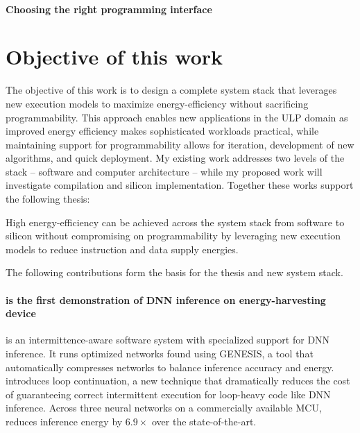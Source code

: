 \paragraph{Choosing the right programming interface}

\section{Objective of this work}

The objective of this work is to design a complete system stack that leverages new execution models to maximize energy-efficiency without sacrificing programmability.
% 
This approach enables new applications in the ULP domain as improved energy efficiency makes sophisticated workloads practical, while maintaining support for programmability allows for iteration, development of new algorithms, and quick deployment. 
% 
My existing work addresses two levels of the stack -- software and computer architecture -- while my proposed work will investigate compilation and silicon implementation.
% 
Together these works support the following thesis:

\begin{adjustwidth}{1cm}{1cm}
% 
% 
% 
High energy-efficiency can be achieved 
across the system stack from software to silicon without compromising on programmability by leveraging new execution models to reduce instruction and data supply energies.
% 

\end{adjustwidth}
% 
The following contributions form the basis for the thesis and new system stack.

\paragraph{\sonic is the first demonstration of DNN inference on energy-harvesting device}
\sonic is an intermittence-aware software system with specialized support for DNN inference. 
% 
It runs optimized networks found using GENESIS, a tool that automatically compresses networks to balance inference accuracy and energy.
% 
\sonic introduces loop continuation, a new technique that dramatically reduces the cost of guaranteeing correct intermittent execution for loop-heavy code like DNN inference. 
% 
Across three neural networks on a commercially available MCU, \sonic reduces inference energy by $6.9\times$ over the state-of-the-art.


